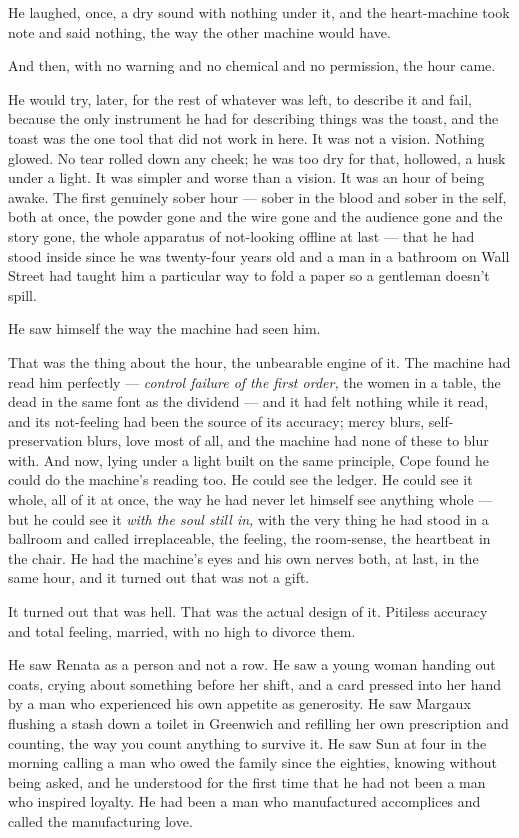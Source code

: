 \documentclass[11pt,openany]{book}
\newcommand{\scenebreak}{\par\vspace{0.5\baselineskip}\begin{center}\textasteriskcentered\quad\textasteriskcentered\quad\textasteriskcentered\end{center}\vspace{0.5\baselineskip}\par}
\begin{document}
He laughed, once, a dry sound with nothing under it, and the heart-machine took note and said nothing, the way the other machine would have.


\scenebreak


And then, with no warning and no chemical and no permission, the hour came.

He would try, later, for the rest of whatever was left, to describe it and fail, because the only instrument he had for describing things was the toast, and the toast was the one tool that did not work in here. It was not a vision. Nothing glowed. No tear rolled down any cheek; he was too dry for that, hollowed, a husk under a light. It was simpler and worse than a vision. It was an hour of being awake. The first genuinely sober hour --- sober in the blood and sober in the self, both at once, the powder gone and the wire gone and the audience gone and the story gone, the whole apparatus of not-looking offline at last --- that he had stood inside since he was twenty-four years old and a man in a bathroom on Wall Street had taught him a particular way to fold a paper so a gentleman doesn't spill.

He saw himself the way the machine had seen him.

That was the thing about the hour, the unbearable engine of it. The machine had read him perfectly --- \textit{control failure of the first order,} the women in a table, the dead in the same font as the dividend --- and it had felt nothing while it read, and its not-feeling had been the source of its accuracy; mercy blurs, self-preservation blurs, love most of all, and the machine had none of these to blur with. And now, lying under a light built on the same principle, Cope found he could do the machine's reading too. He could see the ledger. He could see it whole, all of it at once, the way he had never let himself see anything whole --- but he could see it \textit{with the soul still in,} with the very thing he had stood in a ballroom and called irreplaceable, the feeling, the room-sense, the heartbeat in the chair. He had the machine's eyes and his own nerves both, at last, in the same hour, and it turned out that was not a gift.

It turned out that was hell. That was the actual design of it. Pitiless accuracy and total feeling, married, with no high to divorce them.

He saw Renata as a person and not a row. He saw a young woman handing out coats, crying about something before her shift, and a card pressed into her hand by a man who experienced his own appetite as generosity. He saw Margaux flushing a stash down a toilet in Greenwich and refilling her own prescription and counting, the way you count anything to survive it. He saw Sun at four in the morning calling a man who owed the family since the eighties, knowing without being asked, and he understood for the first time that he had not been a man who inspired loyalty. He had been a man who manufactured accomplices and called the manufacturing love.
\end{document}
